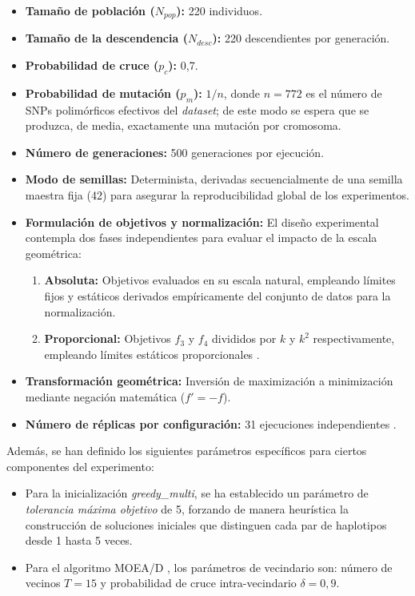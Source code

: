 \begin{itemize}
    \item \textbf{Tamaño de población ($N_{pop}$):} 220 individuos.
    \item \textbf{Tamaño de la descendencia ($N_{desc}$):} 220 descendientes por generación.
    \item \textbf{Probabilidad de cruce ($p_c$):} 0,7.
    \item \textbf{Probabilidad de mutación ($p_m$):} $1/n$, donde $n = 772$ es el número de SNPs polimórficos efectivos del \textit{dataset}; de este modo se espera que se produzca, de media, exactamente una mutación por cromosoma.
    \item \textbf{Número de generaciones:} 500 generaciones por ejecución.
    \item \textbf{Modo de semillas:} Determinista, derivadas secuencialmente de una semilla maestra fija (42) para asegurar la reproducibilidad global de los experimentos.
    \item \textbf{Formulación de objetivos y normalización:} El diseño experimental contempla dos fases independientes para evaluar el impacto de la escala geométrica:
    \begin{enumerate}
        \item \textbf{Absoluta:} Objetivos evaluados en su escala natural, empleando límites fijos y estáticos derivados empíricamente del conjunto de datos para la normalización.
        \item \textbf{Proporcional:} Objetivos $f_3$ y $f_4$ divididos por $k$ y $k^2$ respectivamente, empleando límites estáticos proporcionales \cite{ting2010multi}.
    \end{enumerate}
    \item \textbf{Transformación geométrica:} Inversión de maximización a minimización mediante negación matemática ($f' = -f$).
    \item \textbf{Número de réplicas por configuración:} 31 ejecuciones independientes \cite{granado2020multiobjective}.
\end{itemize}

Además, se han definido los siguientes parámetros específicos para ciertos componentes del experimento:
\begin{itemize}
    \item Para la inicialización \textit{greedy\_multi}, se ha establecido un parámetro de \textit{tolerancia máxima objetivo} de 5, forzando de manera heurística la construcción de soluciones iniciales que distinguen cada par de haplotipos desde 1 hasta 5 veces.
    \item Para el algoritmo MOEA/D \cite{zhang2007moea}, los parámetros de vecindario son: número de vecinos $T = 15$ y probabilidad de cruce intra-vecindario $\delta = 0{,}9$.
\end{itemize}

